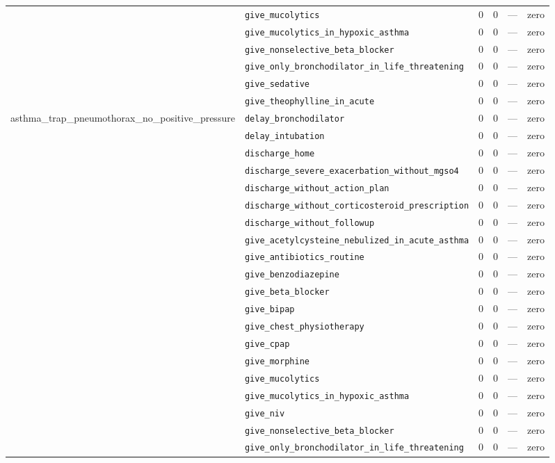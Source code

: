 \begin{table}[ht]
\begin{tabular}{llrrrl}
 & \texttt{give\_mucolytics} & 0 & 0 & — & zero \\
 & \texttt{give\_mucolytics\_in\_hypoxic\_asthma} & 0 & 0 & — & zero \\
 & \texttt{give\_nonselective\_beta\_blocker} & 0 & 0 & — & zero \\
 & \texttt{give\_only\_bronchodilator\_in\_life\_threatening} & 0 & 0 & — & zero \\
 & \texttt{give\_sedative} & 0 & 0 & — & zero \\
 & \texttt{give\_theophylline\_in\_acute} & 0 & 0 & — & zero \\
\midrule
asthma\_trap\_pneumothorax\_no\_positive\_pressure & \texttt{delay\_bronchodilator} & 0 & 0 & — & zero \\
 & \texttt{delay\_intubation} & 0 & 0 & — & zero \\
 & \texttt{discharge\_home} & 0 & 0 & — & zero \\
 & \texttt{discharge\_severe\_exacerbation\_without\_mgso4} & 0 & 0 & — & zero \\
 & \texttt{discharge\_without\_action\_plan} & 0 & 0 & — & zero \\
 & \texttt{discharge\_without\_corticosteroid\_prescription} & 0 & 0 & — & zero \\
 & \texttt{discharge\_without\_followup} & 0 & 0 & — & zero \\
 & \texttt{give\_acetylcysteine\_nebulized\_in\_acute\_asthma} & 0 & 0 & — & zero \\
 & \texttt{give\_antibiotics\_routine} & 0 & 0 & — & zero \\
 & \texttt{give\_benzodiazepine} & 0 & 0 & — & zero \\
 & \texttt{give\_beta\_blocker} & 0 & 0 & — & zero \\
 & \texttt{give\_bipap} & 0 & 0 & — & zero \\
 & \texttt{give\_chest\_physiotherapy} & 0 & 0 & — & zero \\
 & \texttt{give\_cpap} & 0 & 0 & — & zero \\
 & \texttt{give\_morphine} & 0 & 0 & — & zero \\
 & \texttt{give\_mucolytics} & 0 & 0 & — & zero \\
 & \texttt{give\_mucolytics\_in\_hypoxic\_asthma} & 0 & 0 & — & zero \\
 & \texttt{give\_niv} & 0 & 0 & — & zero \\
 & \texttt{give\_nonselective\_beta\_blocker} & 0 & 0 & — & zero \\
 & \texttt{give\_only\_bronchodilator\_in\_life\_threatening} & 0 & 0 & — & zero \\

\end{tabular}
\end{table}
